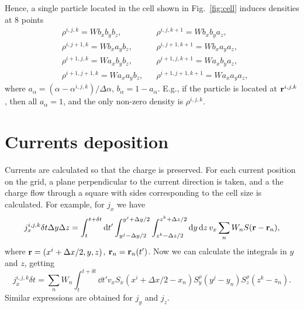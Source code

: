 \documentclass[12pt,a4paper,DIV=calc]{scrartcl}
\begin{document}
Hence, a single particle located in the cell shown in Fig.~\ref{fig:cell} induces densities at 8 points
\begin{equation}
\begin{aligned}
    &\rho^{i,j,k} = W b_x b_y b_z, && \rho^{i,j,k+1} = W b_x b_y a_z,\\
    &\rho^{i,j+1,k} = W b_x a_y b_z, && \rho^{i,j+1,k+1} = W b_x a_y a_z,\\
    &\rho^{i+1,j,k} = W a_x b_y b_z, && \rho^{i+1,j,k+1} = W a_x b_y a_z,\\
    &\rho^{i+1,j+1,k} = W a_x a_y b_z, && \rho^{i+1,j+1,k+1} = W a_x a_y a_z,
\end{aligned}
\end{equation}
where $a_\alpha = (\alpha - \alpha^{i,j,k}) / \Delta \alpha$, $b_\alpha = 1 - a_\alpha$.
E.g., if the particle is located at $\vb{r}^{i,j,k}$, then all $a_\alpha = 1$, and the only non-zero density is $\rho^{i,j,k}$.

\section{Currents deposition}

Currents are calculated so that the charge is preserved.
For each current position on the grid, a plane perpendicular to the current direction is taken, and a the charge flow through a square with sides corresponding to the cell size is calculated.
For example, for $j_x$ we have
\begin{equation}
    j_x^{i,j,k} \delta t \Delta y \Delta z = \int_t^{t+\delta t} \dd{t'} \int_{y^j-\Delta y/2}^{y^j + \Delta y /2}\int_{z^k-\Delta z/2}^{z^k + \Delta z /2} \dd{y}\dd{z} v_x \sum_n W_n S(\vb{r}-\vb{r}_n),
\end{equation}
where $\vb{r} = (x^i+\Delta x /2, y, z)$, $\vb{r}_n = \vb{r}_n(t')$.
Now we can calculate the integrals in $y$ and $z$, getting
\begin{equation}
    j_x^{i,j,k} \delta t = \sum_n W_n \int_t^{t+\delta t} \dd{t'} v_x S_x(x^i + \Delta x/2 - x_n) S^\rho_y(y^j - y_n) S^\rho_z(z^k - z_n).
\end{equation}
Similar expressions are obtained for $j_y$ and $j_z$.
\end{document}
